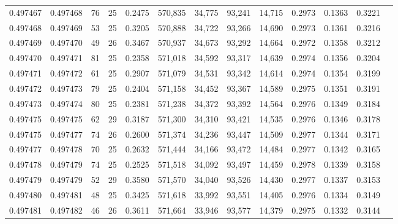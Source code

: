 \begin{tabular}{rrrrrrrrrrrrr}
0.497467 & 0.497468 &  76 &  25 &                                     0.2475 & 570,835 &  34,775 &  93,241 &  14,715 & 0.2973 & 0.1363 & 0.3221 \\
0.497468 & 0.497469 &  53 &  25 &                                     0.3205 & 570,888 &  34,722 &  93,266 &  14,690 & 0.2973 & 0.1361 & 0.3216 \\
0.497469 & 0.497470 &  49 &  26 &                                     0.3467 & 570,937 &  34,673 &  93,292 &  14,664 & 0.2972 & 0.1358 & 0.3212 \\
0.497470 & 0.497471 &  81 &  25 &                                     0.2358 & 571,018 &  34,592 &  93,317 &  14,639 & 0.2974 & 0.1356 & 0.3204 \\
0.497471 & 0.497472 &  61 &  25 &                                     0.2907 & 571,079 &  34,531 &  93,342 &  14,614 & 0.2974 & 0.1354 & 0.3199 \\
0.497472 & 0.497473 &  79 &  25 &                                     0.2404 & 571,158 &  34,452 &  93,367 &  14,589 & 0.2975 & 0.1351 & 0.3191 \\
0.497473 & 0.497474 &  80 &  25 &                                     0.2381 & 571,238 &  34,372 &  93,392 &  14,564 & 0.2976 & 0.1349 & 0.3184 \\
0.497475 & 0.497475 &  62 &  29 &                                     0.3187 & 571,300 &  34,310 &  93,421 &  14,535 & 0.2976 & 0.1346 & 0.3178 \\
0.497475 & 0.497477 &  74 &  26 &                                     0.2600 & 571,374 &  34,236 &  93,447 &  14,509 & 0.2977 & 0.1344 & 0.3171 \\
0.497477 & 0.497478 &  70 &  25 &                                     0.2632 & 571,444 &  34,166 &  93,472 &  14,484 & 0.2977 & 0.1342 & 0.3165 \\
0.497478 & 0.497479 &  74 &  25 &                                     0.2525 & 571,518 &  34,092 &  93,497 &  14,459 & 0.2978 & 0.1339 & 0.3158 \\
0.497479 & 0.497479 &  52 &  29 &                                     0.3580 & 571,570 &  34,040 &  93,526 &  14,430 & 0.2977 & 0.1337 & 0.3153 \\
0.497480 & 0.497481 &  48 &  25 &                                     0.3425 & 571,618 &  33,992 &  93,551 &  14,405 & 0.2976 & 0.1334 & 0.3149 \\
0.497481 & 0.497482 &  46 &  26 &                                     0.3611 & 571,664 &  33,946 &  93,577 &  14,379 & 0.2975 & 0.1332 & 0.3144 \\

\end{tabular}

